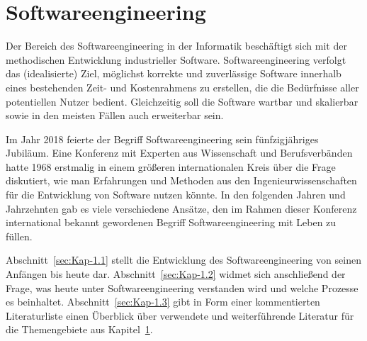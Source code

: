 \cleardoublepage
\chapter{Softwareengineering}
\label{sec:Kap-1}

Der Bereich des Softwareengineering in der Informatik beschäftigt sich mit der methodischen Entwicklung industrieller Software. 
Softwareengineering verfolgt das (idealisierte) Ziel, möglichst korrekte und zuverlässige Software innerhalb eines bestehenden Zeit- und Kostenrahmens zu erstellen, die die Bedürfnisse aller poten\-tiellen Nutzer bedient. Gleichzeitig soll die Software wartbar und skalierbar sowie in den meisten Fällen auch erweiterbar sein. 

Im Jahr 2018 feierte der Begriff Softwareengineering sein fünfzigjähriges Jubiläum. Eine Konferenz 
mit Experten aus Wissenschaft und Berufsverbänden hatte 1968 erstmalig in einem größeren internationalen Kreis über die Frage diskutiert, wie man Erfahrungen und Methoden aus den Ingenieurwissenschaften für die Entwicklung von Software nutzen könnte. In den folgenden Jahren und Jahrzehnten gab es viele verschiedene Ansätze, den im Rahmen dieser Konferenz international bekannt gewordenen Begriff Softwareengineering mit Leben zu füllen. 

Abschnitt~\ref{sec:Kap-1.1} stellt die Entwicklung des Softwareengineering von seinen Anfängen bis heute dar. Abschnitt~\ref{sec:Kap-1.2} widmet sich anschließend der Frage, was heute unter Softwareengineering verstanden wird und welche Prozesse es beinhaltet. Abschnitt~\ref{sec:Kap-1.3} gibt in Form einer kommentierten Literaturliste einen Überblick über verwendete und weiterführende Literatur für die Themengebiete aus Kapitel~\ref{sec:Kap-1}.

\clearpage


\clearpage




\clearpage
